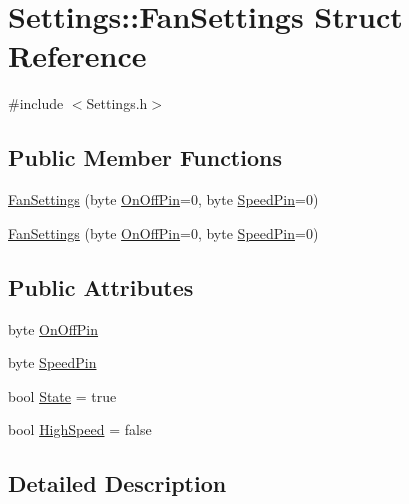 \hypertarget{struct_settings_1_1_fan_settings}{}\section{Settings\+:\+:Fan\+Settings Struct Reference}
\label{struct_settings_1_1_fan_settings}


{\ttfamily \#include $<$Settings.\+h$>$}

\subsection*{Public Member Functions}
\begin{DoxyCompactItemize}
\item 
\hyperlink{struct_settings_1_1_fan_settings_a96ac1cf81f430913c2c12c622a932d69}{Fan\+Settings} (byte \hyperlink{struct_settings_1_1_fan_settings_a4724871dd9a668340d40bff6f09ded2c}{On\+Off\+Pin}=0, byte \hyperlink{struct_settings_1_1_fan_settings_a32abd544ace65ca9a98bb1fad2b5ff8f}{Speed\+Pin}=0)
\item 
\hyperlink{struct_settings_1_1_fan_settings_a96ac1cf81f430913c2c12c622a932d69}{Fan\+Settings} (byte \hyperlink{struct_settings_1_1_fan_settings_a4724871dd9a668340d40bff6f09ded2c}{On\+Off\+Pin}=0, byte \hyperlink{struct_settings_1_1_fan_settings_a32abd544ace65ca9a98bb1fad2b5ff8f}{Speed\+Pin}=0)
\end{DoxyCompactItemize}
\subsection*{Public Attributes}
\begin{DoxyCompactItemize}
\item 
byte \hyperlink{struct_settings_1_1_fan_settings_a4724871dd9a668340d40bff6f09ded2c}{On\+Off\+Pin}
\item 
byte \hyperlink{struct_settings_1_1_fan_settings_a32abd544ace65ca9a98bb1fad2b5ff8f}{Speed\+Pin}
\item 
bool \hyperlink{struct_settings_1_1_fan_settings_a3ea9cf9677be0fa6ab67bf78aa4971f1}{State} = true
\item 
bool \hyperlink{struct_settings_1_1_fan_settings_ae3579c0670e2048e1a6b9d09777adc7f}{High\+Speed} = false
\end{DoxyCompactItemize}


\subsection{Detailed Description}


